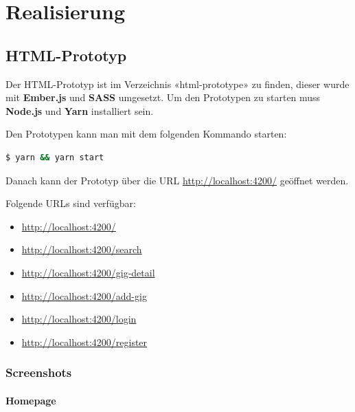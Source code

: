 \chapter{Realisierung}\label{AppendixRealisierung}

\section{HTML-Prototyp}

Der HTML-Prototyp ist im Verzeichnis «html-prototype» zu finden, dieser wurde
mit \textbf{Ember.js} und \textbf{SASS} umgesetzt.
Um den Prototypen zu starten muss \textbf{Node.js} und \textbf{Yarn} installiert sein.

\noindent
Den Prototypen kann man mit dem folgenden Kommando starten:

\begin{lstlisting}[language=bash,frame=single]
$ yarn && yarn start
\end{lstlisting}

\noindent
Danach kann der Prototyp über die URL \url{http://localhost:4200/} geöffnet werden.

\noindent
Folgende URLs sind verfügbar:

\begin{itemize}
  \tightlist{}
  \item{} \url{http://localhost:4200/}
  \item{} \url{http://localhost:4200/search}
  \item{} \url{http://localhost:4200/gig-detail}
  \item{} \url{http://localhost:4200/add-gig}
  \item{} \url{http://localhost:4200/login}
  \item{} \url{http://localhost:4200/register}
\end{itemize}

\clearpage
\subsection{Screenshots}

\subsubsection{Homepage}

